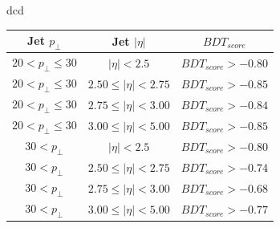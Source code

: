 \documentclass[8pt]{beamer}
\begin{document}
\begin{frame}{dcd}
{\begin{tabular}{|c|c|c|}
\hline
Jet $p_{\perp}$ & Jet $|\eta|$ & $BDT_{score}$ \\
\hline \hline
$20 < p_{\perp} \leq 30$ & $|\eta| < 2.5$ & $BDT_{score} > -0.80$ \\
$20 < p_{\perp} \leq 30$ & $2.50 \leq |\eta| < 2.75$ & $BDT_{score} > -0.85$ \\
$20 < p_{\perp} \leq 30$ & $2.75 \leq |\eta| < 3.00$ & $BDT_{score} > -0.84$ \\
$20 < p_{\perp} \leq 30$ & $3.00 \leq |\eta| < 5.00$ & $BDT_{score} > -0.85$ \\
$30 < p_{\perp}$ & $|\eta| < 2.5$ & $BDT_{score} > -0.80$ \\
$30 < p_{\perp}$ & $2.50 \leq |\eta| < 2.75$ & $BDT_{score} > -0.74$ \\
$30 < p_{\perp}$ & $2.75 \leq |\eta| < 3.00$ & $BDT_{score} > -0.68$ \\
$30 < p_{\perp}$ & $3.00 \leq |\eta| < 5.00$ & $BDT_{score} > -0.77$ \\
\hline
\end{tabular}

}

\end{frame}
\end{document}
